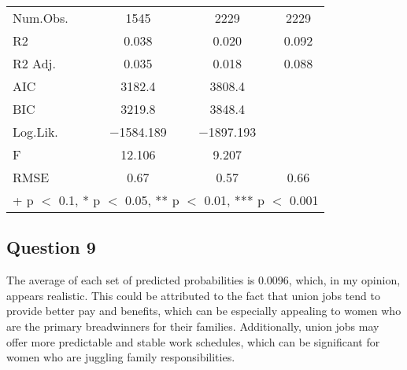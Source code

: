 \documentclass{article}
\begin{document}
\begin{table}[ht]
\begin{tabular}[t]{lccc}
\midrule
Num.Obs. & \num{1545} & \num{2229} & \num{2229}\\
R2 & \num{0.038} & \num{0.020} & \num{0.092}\\
R2 Adj. & \num{0.035} & \num{0.018} & \num{0.088}\\
AIC & \num{3182.4} & \num{3808.4} & \\
BIC & \num{3219.8} & \num{3848.4} & \\
Log.Lik. & \num{-1584.189} & \num{-1897.193} & \\
F & \num{12.106} & \num{9.207} & \\
RMSE & \num{0.67} & \num{0.57} & \num{0.66}\\
\bottomrule
\multicolumn{4}{l}{\rule{0pt}{1em}+ p $<$ 0.1, * p $<$ 0.05, ** p $<$ 0.01, *** p $<$ 0.001}\\
\end{tabular}
\end{table}
\FloatBarrier

\subsection*{Question 9}
The average of each set of predicted probabilities is 0.0096, which, in my opinion, appears realistic. This could be attributed to the fact that union jobs tend to provide better pay and benefits, which can be especially appealing to women who are the primary breadwinners for their families. Additionally, union jobs may offer more predictable and stable work schedules, which can be significant for women who are juggling family responsibilities.
\end{document}
